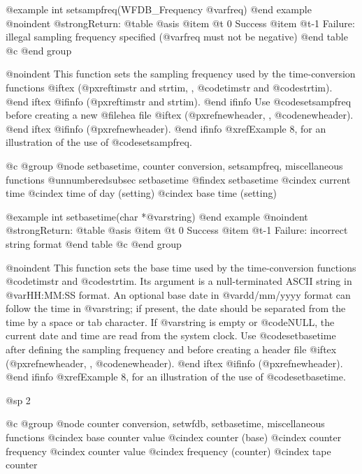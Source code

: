 {{{{{{{{{@example
int setsampfreq(WFDB_Frequency @var{freq})
@end example
@noindent
@strong{Return:}
@table @asis
@item @t{ 0}
Success
@item @t{-1}
Failure:  illegal sampling frequency specified (@var{freq} must not be
negative)
@end table
@c @end group

@noindent
This function sets the sampling frequency used by the time-conversion
functions
@iftex
(@pxref{timstr and strtim, , @code{timstr} and @code{strtim}}).
@end iftex
@ifinfo
(@pxref{timstr and strtim}).
@end ifinfo
Use @code{setsampfreq} before creating a new @file{hea} file
@iftex
(@pxref{newheader, , @code{newheader}}).
@end iftex
@ifinfo
(@pxref{newheader}).
@end ifinfo
@xref{Example 8}, for an illustration of the use of @code{setsampfreq}.

@c @group
@node     setbasetime, counter conversion, setsampfreq, miscellaneous functions
@unnumberedsubsec setbasetime
@findex setbasetime
@cindex current time
@cindex time of day (setting)
@cindex base time (setting)

@example
int setbasetime(char *@var{string})
@end example
@noindent
@strong{Return:}
@table @asis
@item @t{ 0}
Success
@item @t{-1}
Failure: incorrect string format
@end table
@c @end group

@noindent
This function sets the base time used by the time-conversion functions
@code{timstr} and @code{strtim}.  Its argument is a null-terminated
ASCII string in @var{HH:MM:SS} format.  An optional base date in
@var{dd/mm/yyyy} format can follow the time in @var{string}; if present,
the date should be separated from the time by a space or tab character.  If
@var{string} is empty or @code{NULL}, the current date and time are read
from the system clock.  Use @code{setbasetime} after defining the sampling
frequency and before creating a header file
@iftex
(@pxref{newheader, , @code{newheader}}).
@end iftex
@ifinfo
(@pxref{newheader}).
@end ifinfo
@xref{Example 8}, for an illustration of the use of @code{setbasetime}.

@sp 2

@c @group
@node     counter conversion, setwfdb, setbasetime, miscellaneous functions
@cindex base counter value
@cindex counter (base)
@cindex counter frequency
@cindex counter value
@cindex frequency (counter)
@cindex tape counter

}}}}}}}}}
